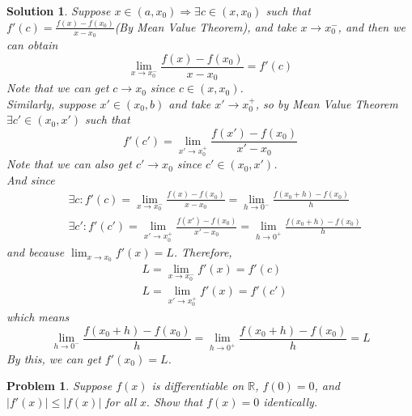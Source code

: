 \documentclass[12pt,a4paper]{article}
\newcommand{\R}{\mathbb{R}}
\theoremstyle{mystyle}
\numberwithin{figure}{subsection}
\newtheorem{prm}{Problem}[subsection] %
\newtheorem{sol}{Solution}[subsection]%
\newenvironment{pr}{\begin{prBox}\begin{prm}}{\end{prm}\end{prBox}}
\begin{document}
\begin{sol}
   Suppose $x\in (a, x_0) \Rightarrow \exists c \in (x,x_0)$ such that $f'(c) = \displaystyle\frac{f(x) - f(x_0)}{x - x_0}$(By Mean Value Theorem), and take $x \longrightarrow x_0^-$, and then we can obtain
   \[
   \lim_{x \to x_0^-}\frac{f(x) - f(x_0)}{x - x_0} = f'(c)
   \]
   Note that we can get $c \longrightarrow x_0$ since $c \in (x,x_0)$. \\
   Similarly, suppose $x' \in (x_0,b)$ and take $x' \longrightarrow x_0^+$, so by Mean Value Theorem $\exists c' \in (x_0,x')$ such that 
   $$f'(c') = \lim_{x' \to x_0^+} \frac{f(x') - f(x_0)}{x' - x_0}$$
   Note that we can also get $c' \longrightarrow x_0$ since $c' \in (x_0,x')$. \\
   And since
   \begin{align*}
       &\exists c: f'(c) = \lim_{x \to x_0^-}\frac{f(x) - f(x_0)}{x - x_0} = \lim_{h \to 0^-}\frac{f(x_0+h) - f(x_0)}{h} \\
       &\exists c': f'(c') = \lim_{x' \to x_0^+}\frac{f(x') - f(x_0)}{x' - x_0} = \lim_{h \to 0^+}\frac{f(x_0+h) - f(x_0)}{h}
   \end{align*}
   and because $\displaystyle\lim_{x \to x_0}f'(x) = L$. Therefore,
   \begin{align*}
       &L = \lim_{x \to x_0^-}f'(x) = f'(c) \\
       &L = \lim_{x' \to x_0^+}f'(x) = f'(c')
   \end{align*}
   which means
   \[
   \lim_{h \to 0^-}\frac{f(x_0+h) - f(x_0)}{h} = \lim_{h \to 0^+}\frac{f(x_0+h) - f(x_0)}{h} = L
   \]
   By this, we can get $f'(x_0) = L$.
\end{sol}
\begin{pr}
Suppose $f(x)$ is differentiable on $\R$, $f(0)=0$, and $|f'(x)| \le |f(x)|$ for all $x.$ Show that $f(x)=0$ identically.
\end{pr}
\end{document}
